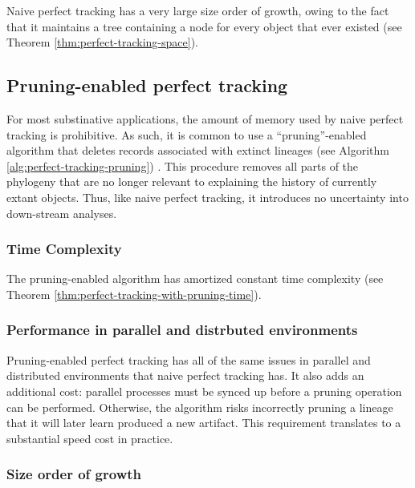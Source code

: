 Naive perfect tracking has a very large size order of growth, owing to the fact that it maintains a tree containing a node for every object that ever existed (see Theorem \ref{thm:perfect-tracking-space}).



\subsection{Pruning-enabled perfect tracking}
\label{sec:naive-perfect-tracking-with-pruning}

For most substinative applications, the amount of memory used by naive perfect tracking is prohibitive.
As such, it is common to use a ``pruning''-enabled algorithm that deletes records associated with extinct lineages (see Algorithm \ref{alg:perfect-tracking-pruning}) \citep{dolson2023phylotrackpy}.
This procedure removes all parts of the phylogeny that are no longer relevant to explaining the history of currently extant objects.
Thus, like naive perfect tracking, it introduces no uncertainty into down-stream analyses.



\subsubsection{Time Complexity}

The pruning-enabled algorithm has amortized constant time complexity (see Theorem \ref{thm:perfect-tracking-with-pruning-time}).



\subsubsection{Performance in parallel and distrbuted environments}
\label{sec:perfect-tracking-pruning-distrbuted}
Pruning-enabled perfect tracking has all of the same issues in parallel and distributed environments that naive perfect tracking has.
It also adds an additional cost: parallel processes must be synced up before a pruning operation can be performed.
Otherwise, the algorithm risks incorrectly pruning a lineage that it will later learn produced a new artifact.
This requirement translates to a substantial speed cost in practice. 


\subsubsection{Size order of growth}
\label{sec:perfect-tracking-pruning-space}

